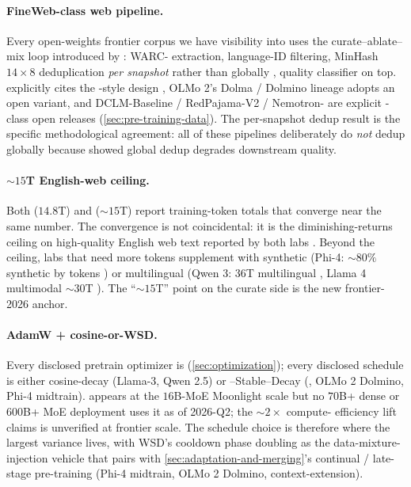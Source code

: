 \paragraph{FineWeb-class web pipeline.}
Every open-weights frontier corpus we have visibility into uses the
curate--ablate--mix loop introduced by  \citep{fineweb2024}:
WARC- extraction, language-ID filtering, MinHash
$14 \times 8$ deduplication \emph{per snapshot} rather than globally
\citep[\S 3.4]{fineweb2024}, quality classifier on top.
\citet{deepseek-v3} explicitly cites the -style design
\citep[\S 2]{deepseek-v3}, OLMo 2's Dolma / Dolmino lineage
\citep{olmo2} adopts an open variant, and DCLM-Baseline / RedPajama-V2
/ Nemotron- are explicit -class open releases
(\cref{sec:pre-training-data}). The per-snapshot dedup result is the
specific methodological agreement: all of these pipelines
deliberately do \emph{not} dedup globally because
\citet[\S 3.4]{fineweb2024} showed global dedup degrades downstream
quality.

\paragraph{$\sim 15$T English-web ceiling.}
Both \citet{deepseek-v3} ($14.8$T) and \citet{meta-llama3}
($\sim\!15$T) report training-token totals that converge near the
same number. The convergence is not coincidental: it is the
diminishing-returns ceiling on high-quality English web text reported
by both labs \citep[\S 4]{deepseek-v3}. Beyond the ceiling, labs
that need more tokens supplement with synthetic (Phi-4: $\sim 80\%$
synthetic by tokens \citep[\S 1]{phi4}) or multilingual (Qwen 3:
$36$T multilingual \citep{qwen3}, Llama 4 multimodal $\sim\!30$T
\citep{meta-llama4}). The ``$\sim 15$T'' point on the curate side
is the new frontier-2026 anchor.

\paragraph{AdamW + cosine-or-WSD.}
Every disclosed pretrain optimizer is 
(\cref{sec:optimization}); every disclosed schedule is either
cosine-decay (Llama-3, Qwen 2.5) or --Stable--Decay
\citep[\S 3.3]{muon-moonlight2025} (, OLMo 2 Dolmino,
Phi-4 midtrain).  \citep{muon-moonlight2025} appears at the
$16$B-MoE Moonlight scale but no $70$B+ dense or $600$B+ MoE
deployment uses it as of 2026-Q2; the $\sim\!2\times$ compute-
efficiency lift  claims is unverified at frontier scale. The
schedule choice is therefore where the largest variance lives, with
WSD's cooldown phase doubling as the data-mixture-injection vehicle
that pairs with \cref{sec:adaptation-and-merging}'s continual /
late-stage pre-training (Phi-4 midtrain, OLMo 2 Dolmino, 
context-extension).


